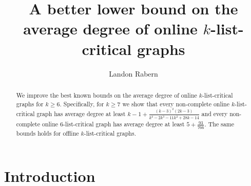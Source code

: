 \documentclass[12pt]{article}
\title{A better lower bound on the average degree of online $k$-list-critical graphs}
\author{Landon Rabern}
\theoremstyle{plain}
\theoremstyle{definition}
\theoremstyle{remark}
\begin{document}
\maketitle

\begin{abstract}
		We improve the best known bounds on the average degree of online $k$-list-critical graphs for $k \ge 6$. 
		Specifically, for $k \ge 7$ we show that every non-complete online $k$-list-critical graph has average degree at least $k-1 + \frac{(k-3)^2 (2 k-3)}{k^4-2 k^3-11 k^2+28 k-14}$
		and every non-complete online $6$-list-critical graph has average degree at least $5 + \frac{93}{766}$.
		The same bounds holds for offline $k$-list-critical graphs.
\end{abstract}

\section{Introduction}
\end{document}
